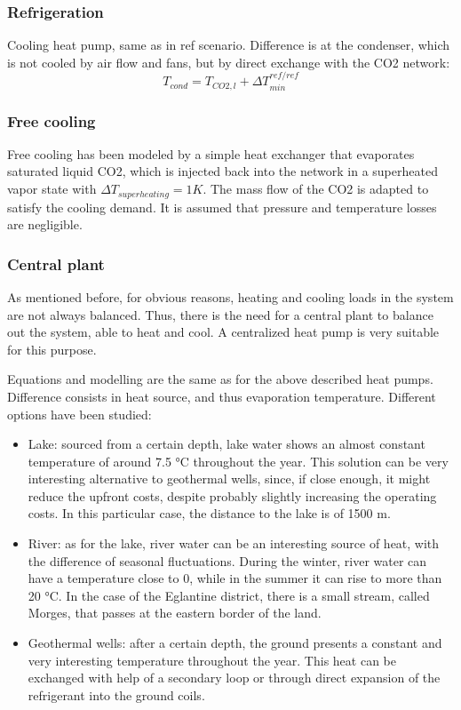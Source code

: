 \documentclass{article}
\begin{document}
\subsubsection{Refrigeration}
Cooling heat pump, same as in ref scenario.
Difference is at the condenser, which is not cooled by air flow and fans, but by direct exchange with the CO2 network:
\begin{equation}
    T_{cond} = T_{CO2,l} + \Delta T_{min}^{ref/ref}
\end{equation}

\subsubsection{Free cooling}
Free cooling has been modeled by a simple heat exchanger that evaporates saturated liquid CO2, which is injected back into the network in a superheated vapor state with $\Delta T_{superheating} = 1K$. The mass flow of the CO2 is adapted to satisfy the cooling demand. It is assumed that pressure and temperature losses are negligible.

\subsubsection{Central plant}
As mentioned before, for obvious reasons, heating and cooling loads in the system are not always balanced. Thus, there is the need for a central plant to balance out the system, able to heat and cool. A centralized heat pump is very suitable for this purpose.

Equations and modelling are the same as for the above described heat pumps. Difference consists in heat source, and thus evaporation temperature. Different options have been studied:
\begin{itemize}
    \item Lake: sourced from a certain depth, lake water shows an almost constant temperature of around 7.5 \si{\celsius} throughout the year. This solution can be very interesting alternative to geothermal wells, since, if close enough, it might reduce the upfront costs, despite probably slightly increasing the operating costs. In this particular case, the distance to the lake is of 1500 m.
    \item River: as for the lake, river water can be an interesting source of heat, with the difference of seasonal fluctuations. During the winter, river water can have a temperature close to 0, while in the summer it can rise to more than 20 \si{\celsius}. In the case of the Eglantine district, there is a small stream, called Morges, that passes at the eastern border of the land.
    \item Geothermal wells: after a certain depth, the ground presents a constant and very interesting temperature throughout the year. This heat can be exchanged with help of a secondary loop or through direct expansion of the refrigerant into the ground coils.
\end{itemize}
\end{document}
